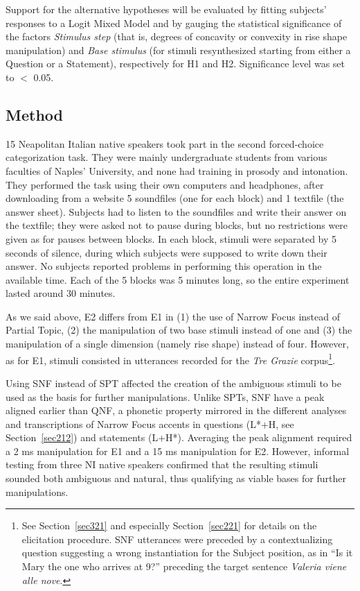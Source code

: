 Support for the alternative hypotheses will be evaluated by fitting subjects' responses to a Logit Mixed Model and by gauging the statistical significance of the factors \textit{Stimulus step} (that is, degrees of concavity or convexity in rise shape manipulation) and \textit{Base stimulus} (for stimuli resynthesized starting from either a Question or a Statement), respectively for H1 and H2. Significance level was set to $<$ 0.05.

\subsection{Method}\label{sec331}
15 Neapolitan Italian native speakers took part in the second forced-choice categorization task. They were mainly undergraduate students from various faculties of Naples' University, and none had training in prosody and intonation. They performed the task using their own computers and headphones, after downloading from a website 5 soundfiles (one for each block) and 1 textfile (the answer sheet).
Subjects had to listen to the soundfiles and write their answer on the textfile; they were asked not to pause during blocks, but no restrictions were given as for pauses between blocks. In each block, stimuli were separated by 5 seconds of silence, during which subjects were supposed to write down their answer. No subjects reported problems in performing this operation in the available time. Each of the 5 blocks was 5 minutes long, so the entire experiment lasted around 30 minutes. 

As we said above, E2 differs from E1 in (1) the use of Narrow Focus instead of Partial Topic, (2) the manipulation of two base stimuli instead of one and (3) the manipulation of a single dimension (namely rise shape) instead of four. However, as for E1, stimuli consisted in utterances recorded for the \textit{Tre Grazie} corpus\footnote{See Section~\ref{sec321} and especially Section~\ref{sec221} for details on the elicitation procedure. SNF utterances were preceded by a contextualizing question suggesting a wrong instantiation for the Subject position, as in ``Is it Mary the one who arrives at 9?'' preceding the target sentence \textit{Valeria viene alle nove}.}.

Using SNF instead of SPT affected the creation of the ambiguous stimuli to be used as the basis for further manipulations. Unlike SPTs, SNF have a peak aligned earlier than QNF, a phonetic property mirrored in the different analyses and transcriptions of Narrow Focus accents in questions (L*+H, see Section~\ref{sec212}) and statements (L+H*). Averaging the peak alignment required a 2 ms manipulation for E1 and a 15 ms manipulation for E2. However, informal testing from three NI native speakers confirmed that the resulting stimuli sounded both ambiguous and natural, thus qualifying as viable bases for further manipulations.

